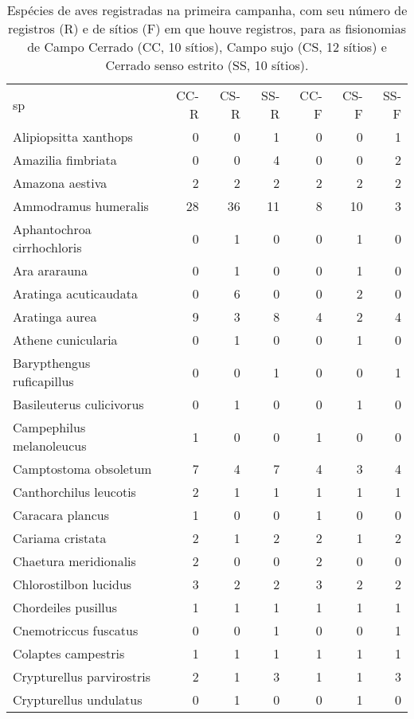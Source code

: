 \begin{table}%
  \label{tab:aves1}
  \caption{Espécies de aves registradas na primeira campanha, com
    seu número de registros (R) e de sítios (F) em que houve registros, 
    para as fisionomias de Campo Cerrado (CC, 10 sítios), Campo sujo (CS, 12 sítios) 
    e Cerrado senso estrito (SS, 10 sítios).}
  \begin{tabular}{lrrrrrr}
    sp & CC-R & CS-R & SS-R &  CC-F & CS-F & SS-F \\
    Alipiopsitta xanthops & 0 & 0 & 1 & 0 & 0 & 1 \\ 
    Amazilia fimbriata & 0 & 0 & 4 & 0 & 0 & 2 \\ 
    Amazona aestiva & 2 & 2 & 2 & 2 & 2 & 2 \\ 
    Ammodramus humeralis & 28 & 36 & 11 & 8 & 10 & 3 \\ 
    Aphantochroa cirrhochloris & 0 & 1 & 0 & 0 & 1 & 0 \\ 
    Ara ararauna & 0 & 1 & 0 & 0 & 1 & 0 \\ 
    Aratinga acuticaudata & 0 & 6 & 0 & 0 & 2 & 0 \\ 
    Aratinga aurea & 9 & 3 & 8 & 4 & 2 & 4 \\ 
    Athene cunicularia & 0 & 1 & 0 & 0 & 1 & 0 \\ 
    Barypthengus ruficapillus & 0 & 0 & 1 & 0 & 0 & 1 \\ 
    Basileuterus culicivorus & 0 & 1 & 0 & 0 & 1 & 0 \\ 
    Campephilus melanoleucus & 1 & 0 & 0 & 1 & 0 & 0 \\ 
    Camptostoma obsoletum & 7 & 4 & 7 & 4 & 3 & 4 \\ 
    Canthorchilus leucotis & 2 & 1 & 1 & 1 & 1 & 1 \\ 
    Caracara plancus & 1 & 0 & 0 & 1 & 0 & 0 \\ 
    Cariama cristata & 2 & 1 & 2 & 2 & 1 & 2 \\ 
    Chaetura meridionalis & 2 & 0 & 0 & 2 & 0 & 0 \\ 
    Chlorostilbon lucidus & 3 & 2 & 2 & 3 & 2 & 2 \\ 
    Chordeiles pusillus & 1 & 1 & 1 & 1 & 1 & 1 \\ 
    Cnemotriccus fuscatus & 0 & 0 & 1 & 0 & 0 & 1 \\ 
    Colaptes campestris & 1 & 1 & 1 & 1 & 1 & 1 \\ 
    Crypturellus parvirostris & 2 & 1 & 3 & 1 & 1 & 3 \\ 
    Crypturellus undulatus & 0 & 1 & 0 & 0 & 1 & 0 \\ 

\end{tabular}
\end{table}
